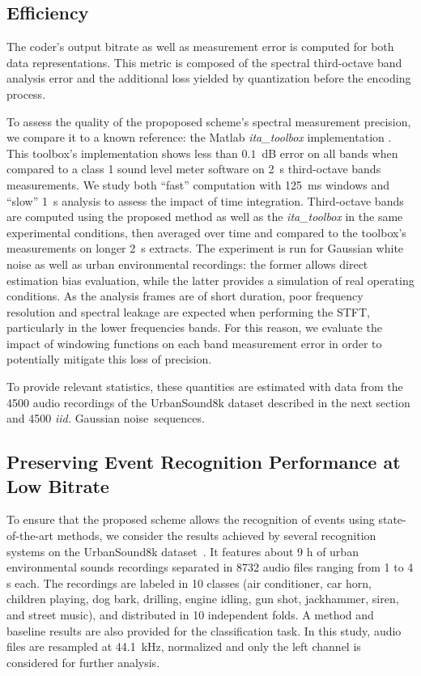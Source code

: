 \documentclass[sensors,article,accept,moreauthors,pdftex,10pt,a4paper]{mdpi}
\begin{document}
\subsection{Efficiency} \label{sec:efficiency_p}

The coder's output bitrate as well as measurement error is computed for both data representations. This metric is composed of the spectral third-octave band analysis error and the additional loss yielded by quantization before the encoding process.

{To} assess the quality of the propoposed scheme's spectral measurement precision, we compare it to a known reference: the Matlab \textit{ita\_toolbox} implementation \cite{itatoolbox2017}. This toolbox's implementation shows less than $0.1$~dB error on all bands when compared to a class 1 sound level meter software on 2~s third-octave bands measurements. We study both ``fast'' computation with 125~ms windows and ``slow'' 1~s analysis to assess the impact of time integration. Third-octave bands are computed using the proposed method as well as the \textit{ita\_toolbox} in the same experimental conditions, then averaged over time and compared to the toolbox's measurements on longer 2~s extracts. The experiment is run for Gaussian white noise as well as urban environmental recordings: the former allows direct estimation bias evaluation, while the latter provides a simulation of real operating conditions. As the analysis frames are of short duration, poor frequency resolution and spectral leakage are expected when performing the STFT, particularly in the lower frequencies bands. For this {reason,} we evaluate the impact of windowing functions on each band measurement error in order to potentially mitigate this loss of precision.

To provide relevant statistics, these quantities are estimated with data from the 4500 audio recordings of the UrbanSound8k dataset \cite{salamon2014} described in the next section and 4500 \textit{iid.} Gaussian \mbox{noise sequences.}

\subsection{Preserving Event Recognition Performance at Low Bitrate} \label{sec:event_p}

{To} ensure that the proposed scheme allows the recognition of events using state-of-the-art methods, we consider the results achieved by several recognition systems on the UrbanSound8k dataset~\cite{salamon2014}. It features about 9 h of urban environmental sounds recordings separated in 8732 audio files ranging from 1 to 4 s each. The recordings are labeled in 10 classes (air conditioner, car horn, children playing, dog bark, drilling, engine idling, gun shot, jackhammer, siren,{ and} street music), and distributed in 10 independent folds. A method and baseline results are also provided for the classification task. In this study, audio files are resampled at 44.1~kHz, normalized and only the left channel is considered for further analysis.
\end{document}
